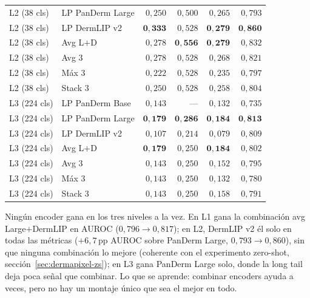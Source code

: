 \begin{table}[htbp]
\begin{tabular}{llrrrr}
L2 (38 cls)  & LP PanDerm Large            & $0{,}250$          & $0{,}500$          & $0{,}265$          & $0{,}793$ \\
L2 (38 cls)  & LP DermLIP v2               & $\mathbf{0{,}333}$ & $0{,}528$          & $\mathbf{0{,}279}$ & $\mathbf{0{,}860}$ \\
L2 (38 cls)  & Avg L$+$D                   & $0{,}278$          & $\mathbf{0{,}556}$ & $\mathbf{0{,}279}$ & $0{,}832$ \\
L2 (38 cls)  & Avg 3                       & $0{,}278$          & $0{,}528$          & $0{,}268$          & $0{,}821$ \\
L2 (38 cls)  & Máx 3                       & $0{,}222$          & $0{,}528$          & $0{,}235$          & $0{,}797$ \\
L2 (38 cls)  & Stack 3                     & $0{,}250$          & $0{,}528$          & $0{,}258$          & $0{,}804$ \\
\hline
L3 (224 cls) & LP PanDerm Base             & $0{,}143$          & ---                & $0{,}132$          & $0{,}735$ \\
L3 (224 cls) & LP PanDerm Large            & $\mathbf{0{,}179}$ & $\mathbf{0{,}286}$ & $\mathbf{0{,}184}$ & $\mathbf{0{,}813}$ \\
L3 (224 cls) & LP DermLIP v2               & $0{,}107$          & $0{,}214$          & $0{,}079$          & $0{,}809$ \\
L3 (224 cls) & Avg L$+$D                   & $\mathbf{0{,}179}$ & $0{,}250$          & $\mathbf{0{,}184}$ & $0{,}802$ \\
L3 (224 cls) & Avg 3                       & $0{,}143$          & $0{,}250$          & $0{,}152$          & $0{,}795$ \\
L3 (224 cls) & Máx 3                       & $0{,}143$          & $0{,}250$          & $0{,}132$          & $0{,}780$ \\
L3 (224 cls) & Stack 3                     & $0{,}143$          & $0{,}250$          & $0{,}158$          & $0{,}791$ \\
\hline
\end{tabular}
\end{table}

Ningún encoder gana en los tres niveles a la vez. En L1 gana la
combinación avg Large$+$DermLIP en AUROC ($0{,}796 \to 0{,}817$); en L2,
DermLIP v2 él solo en todas las métricas ($+6{,}7$\,pp AUROC sobre
PanDerm Large, $0{,}793 \to 0{,}860$), sin que ninguna combinación lo
mejore (coherente con el experimento zero-shot,
sección~\ref{sec:dermapixel-zs}); en L3 gana PanDerm Large solo, donde
la long tail deja poca señal que combinar. Lo que se aprende: combinar
encoders ayuda a veces, pero no hay un montaje único que sea el mejor
en todo.


